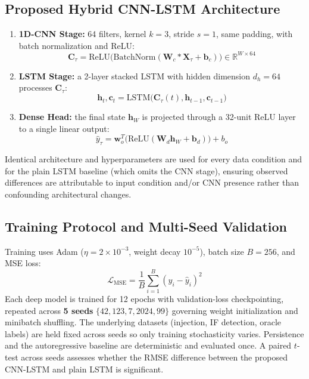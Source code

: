 \documentclass[conference]{IEEEtran}
\begin{document}
\subsection{Proposed Hybrid CNN-LSTM Architecture}
\begin{enumerate}
    \item \textbf{1D-CNN Stage:} 64 filters, kernel $k=3$, stride $s=1$, same padding, with batch normalization and ReLU:
    \begin{equation}
    \mathbf{C}_\tau = \text{ReLU}\big(\text{BatchNorm}(\mathbf{W}_c * \mathbf{X}_\tau + \mathbf{b}_c)\big) \in \mathbb{R}^{W \times 64}
    \end{equation}
    \item \textbf{LSTM Stage:} a 2-layer stacked LSTM with hidden dimension $d_h=64$ processes $\mathbf{C}_\tau$:
    \begin{equation}
    \mathbf{h}_t, \mathbf{c}_t = \text{LSTM}\big(\mathbf{C}_\tau(t), \mathbf{h}_{t-1}, \mathbf{c}_{t-1}\big)
    \end{equation}
    \item \textbf{Dense Head:} the final state $\mathbf{h}_W$ is projected through a 32-unit ReLU layer to a single linear output:
    \begin{equation}
    \hat{y}_\tau = \mathbf{w}_o^T\big(\text{ReLU}(\mathbf{W}_d \mathbf{h}_W + \mathbf{b}_d)\big) + b_o
    \end{equation}
\end{enumerate}
Identical architecture and hyperparameters are used for every data condition and for the plain LSTM baseline (which omits the CNN stage), ensuring observed differences are attributable to input condition and/or CNN presence rather than confounding architectural changes.

\subsection{Training Protocol and Multi-Seed Validation}
Training uses Adam ($\eta = 2\times 10^{-3}$, weight decay $10^{-5}$), batch size $B=256$, and MSE loss:
\begin{equation}
\mathcal{L}_{\text{MSE}} = \frac{1}{B}\sum_{i=1}^{B}\left(y_i - \hat{y}_i\right)^2
\end{equation}
Each deep model is trained for 12 epochs with validation-loss checkpointing, repeated across \textbf{5 seeds} $\{42, 123, 7, 2024, 99\}$ governing weight initialization and minibatch shuffling. The underlying datasets (injection, IF detection, oracle labels) are held fixed across seeds so only training stochasticity varies. Persistence and the autoregressive baseline are deterministic and evaluated once. A paired $t$-test across seeds assesses whether the RMSE difference between the proposed CNN-LSTM and plain LSTM is significant.
\end{document}

